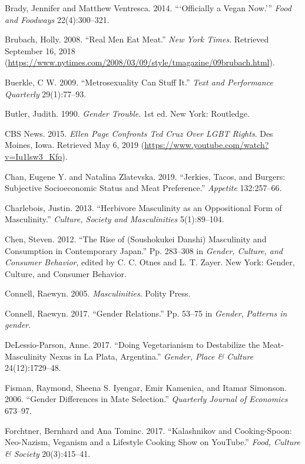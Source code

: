 \documentclass[twoside]{report}
\begin{document}
\begin{multicols*}{2}
\hypertarget{brady}{Brady, Jennifer and Matthew Ventresca. 2014. ```Officially a Vegan
Now.''' \emph{Food and Foodways} 22(4):300--321.}

\hypertarget{brubach}{Brubach, Holly. 2008. ``Real Men Eat Meat.'' \emph{New York Times}.
Retrieved September 16, 2018
(\url{https://www.nytimes.com/2008/03/09/style/tmagazine/09brubach.html}).}

\hypertarget{buerkle}{Buerkle, C W. 2009. ``Metrosexuality Can Stuff It.'' \emph{Text and
Performance Quarterly} 29(1):77--93.}

\hypertarget{butler}{Butler, Judith. 1990. \emph{Gender Trouble}. 1st ed. New York:
Routledge.}

\hypertarget{cbs}{CBS News. 2015. \emph{Ellen Page Confronts Ted Cruz Over LGBT Rights}.
Des Moines, Iowa. Retrieved May 6, 2019
(\url{https://www.youtube.com/watch?v=Iu1lsw3_Kfo}).}

\hypertarget{chan}{Chan, Eugene Y. and Natalina Zlatevska. 2019. ``Jerkies, Tacos, and
Burgers: Subjective Socioeconomic Status and Meat Preference.''
\emph{Appetite} 132:257--66.}

\hypertarget{charlebois}{Charlebois, Justin. 2013. ``Herbivore Masculinity as an Oppositional
Form of Masculinity.'' \emph{Culture, Society and Masculinities}
5(1):89--104.}

\hypertarget{chen}{Chen, Steven. 2012. ``The Rise of (Soushokukei Danshi) Masculinity and
Consumption in Contemporary Japan.'' Pp. 283--308 in \emph{Gender,
Culture, and Consumer Behavior}, edited by C. C. Otnes and L. T. Zayer.
New York: Gender, Culture, and Consumer Behavior.}

\hypertarget{connell}{Connell, Raewyn. 2005. \emph{Masculinities}. Polity Press.}

\hypertarget{connell2}{Connell, Raewyn. 2017. ``Gender Relations.'' Pp. 53--75 in
\emph{Gender}, \emph{Patterns in gender}.}

\hypertarget{delassio-parson}{DeLessio-Parson, Anne. 2017. ``Doing Vegetarianism to Destabilize the
Meat-Masculinity Nexus in La Plata, Argentina.'' \emph{Gender, Place \&
Culture} 24(12):1729--48.}

\hypertarget{fisman}{Fisman, Raymond, Sheena S. Iyengar, Emir Kamenica, and Itamar Simonson.
2006. ``Gender Differences in Mate Selection.'' \emph{Quarterly Journal
of Economics} 673--97.}

\hypertarget{forchtner}{Forchtner, Bernhard and Ana Tominc. 2017. ``Kalashnikov and
Cooking-Spoon: Neo-Nazism, Veganism and a Lifestyle Cooking Show on
YouTube.'' \emph{Food, Culture \& Society} 20(3):415--41.}


\end{multicols*}
\end{document}
